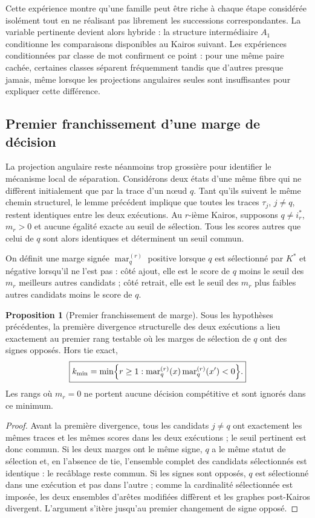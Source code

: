 \documentclass[11pt,a4paper]{article}
\theoremstyle{definition}
\newtheorem{propositionthm}[definition]{Proposition}
\theoremstyle{remark}
\begin{document}
Cette expérience montre qu'une famille peut être riche à chaque étape considérée isolément tout en ne réalisant pas librement les successions correspondantes. La variable pertinente devient alors hybride : la structure intermédiaire $A_1$ conditionne les comparaisons disponibles au Kairos suivant. Les expériences conditionnées par classe de mot confirment ce point : pour une même paire cachée, certaines classes séparent fréquemment tandis que d'autres presque jamais, même lorsque les projections angulaires seules sont insuffisantes pour expliquer cette différence.

\subsection{Premier franchissement d'une marge de décision}

La projection angulaire reste néanmoins trop grossière pour identifier le mécanisme local de séparation. Considérons deux états d'une même fibre qui ne diffèrent initialement que par la trace d'un nœud $q$. Tant qu'ils suivent le même chemin structurel, le lemme précédent implique que toutes les traces $\tau_j$, $j\neq q$, restent identiques entre les deux exécutions. Au $r$-ième Kairos, supposons $q\neq i_r^*$, $m_r>0$ et aucune égalité exacte au seuil de sélection. Tous les scores autres que celui de $q$ sont alors identiques et déterminent un seuil commun.

On définit une marge signée $\operatorname{mar}_q^{(r)}$ positive lorsque $q$ est sélectionné par $K^*$ et négative lorsqu'il ne l'est pas : côté ajout, elle est le score de $q$ moins le seuil des $m_r$ meilleurs autres candidats ; côté retrait, elle est le seuil des $m_r$ plus faibles autres candidats moins le score de $q$.

\begin{propositionthm}[Premier franchissement de marge]
Sous les hypothèses précédentes, la première divergence structurelle des deux exécutions a lieu exactement au premier rang testable où les marges de sélection de $q$ ont des signes opposés. Hors tie exact,
\[
\boxed{
 k_{\min}
 =\min\Bigl\{r\geq1:
 \operatorname{mar}_q^{(r)}(x)\operatorname{mar}_q^{(r)}(x')<0\Bigr\}.}
\]
Les rangs où $m_r=0$ ne portent aucune décision compétitive et sont ignorés dans ce minimum.
\end{propositionthm}

\begin{proof}
Avant la première divergence, tous les candidats $j\neq q$ ont exactement les mêmes traces et les mêmes scores dans les deux exécutions ; le seuil pertinent est donc commun. Si les deux marges ont le même signe, $q$ a le même statut de sélection et, en l'absence de tie, l'ensemble complet des candidats sélectionnés est identique : le recâblage reste commun. Si les signes sont opposés, $q$ est sélectionné dans une exécution et pas dans l'autre ; comme la cardinalité sélectionnée est imposée, les deux ensembles d'arêtes modifiées diffèrent et les graphes post-Kairos divergent. L'argument s'itère jusqu'au premier changement de signe opposé.
\end{proof}
\end{document}
